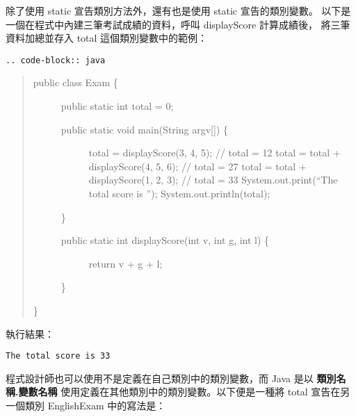 \documentclass[a4paper,12pt,english]{sphinxmanual}
\begin{document}
除了使用 static 宣告類別方法外，還有也是使用 static 宣告的類別變數。
以下是一個在程式中內建三筆考試成績的資料，呼叫 displayScore 計算成績後，
將三筆資料加總並存入 total 這個類別變數中的範例：

\begin{Verbatim}[commandchars=@\[\]]
.. code-block:: java
\end{Verbatim}
\begin{quote}
\begin{description}
\item[{public class Exam \{}] \leavevmode
public static int total = 0;
\begin{description}
\item[{public static void main(String argv{[}{]}) \{}] \leavevmode
total = displayScore(3, 4, 5); // total = 12
total = total + displayScore(4, 5, 6);          // total = 27
total = total + displayScore(1, 2, 3);          // total = 33
System.out.print(``The total score is '');
System.out.println(total);

\end{description}

\}
\begin{description}
\item[{public static int displayScore(int v, int g, int l) \{}] \leavevmode
return v + g + l;

\end{description}

\}

\end{description}

\}
\end{quote}

執行結果：

\begin{Verbatim}[commandchars=@\[\]]
The total score is 33
\end{Verbatim}

程式設計師也可以使用不是定義在自己類別中的類別變數，而 Java 是以 \textbf{類別名稱.變數名稱}
使用定義在其他類別中的類別變數。以下便是一種將 total 宣告在另一個類別 EnglishExam 中的寫法是：
\end{document}
